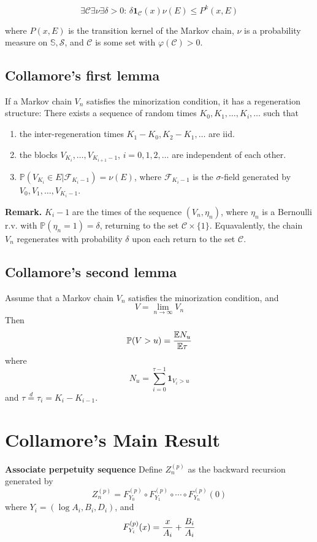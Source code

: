 \documentclass[12pt]{article}
\newcommand{\E}{
        \mathbb{E}
}
\newcommand{\p}{
        \mathbb{P}
}
\newcommand{\I}[1]{
        \mathbf 1_{#1}
}
\begin{document}
\begin{equation}\label{eq:M}
\exists \mathcal C \exists \nu \exists \delta > 0\text{: }
\delta \I{\mathcal C}(x) \nu(E) \leq P^k(x, E)
\end{equation}

where $P(x, E)$ is the transition kernel of the Markov chain, $\nu$
is a probability measure on $\mathbb S, \mathcal S$, and $\mathcal C$
is some set with $\varphi(\mathcal C) > 0$.

\subsection{Collamore's first lemma}
If a Markov chain $V_n$ satisfies the minorization condition, it has a
regeneration structure: There exists a sequence of random times $K_0,
K_1, \dots, K_i, \dots$ such that
\begin{enumerate}
\item the inter-regeneration times $K_1 - K_0, K_2 - K_1, \dots$ are iid.
\item the blocks $V_{K_i}, \dots, V_{K_{i+1}-1}$, $i=0, 1, 2, \dots$ are
independent of each other.

\item $\p(V_{K_i} \in E | \mathcal F_{K_i - 1}) = \nu(E)$, where $\mathcal
F_{K_i - 1}$ is the $\sigma$-field generated by $V_0, V_1, \dots, V_{K_i-1}$.
\end{enumerate}

{\bf Remark. } $K_i-1$ are the times of the sequence $(V_n, \eta_n)$, where
$\eta_n$ is a Bernoulli r.v. with $\p(\eta_n = 1) = \delta$, returning to
the set $\mathcal C \times \{1\}$. Equavalently, the chain $V_n$ regenerates
with probability $\delta$ upon each return to the set $\mathcal C$.

\subsection{Collamore's second lemma}
Assume that a Markov chain $V_n$ satisfies the minorization condition, and
\[
        V = \lim_{n \to \infty} V_n
\]
Then
\[
\p(V > u) = {\E N_u \over \E \tau}
\]
where
\[
        N_u = \sum_{i=0}^{\tau - 1} \I{V_i > u}
\]
and $\tau \overset{d}{=} \tau_i = K_i - K_{i-1}$.

\section{Collamore's Main Result}
{\bf Associate perpetuity sequence}
Define $Z^{(p)}_n$ as the backward recursion generated by
\[
Z^{(p)}_n = F^{(p)}_{Y_0} \circ F^{(p)}_{Y_1} \circ \cdots
\circ F^{(p)}_{Y_n}(0)
\]
where $Y_i = (\log A_i, B_i, D_i)$, and
\[
F^{(p)}_{Y_i}(x) = {x \over A_i} + {B_i \over A_i}
\]
\end{document}
